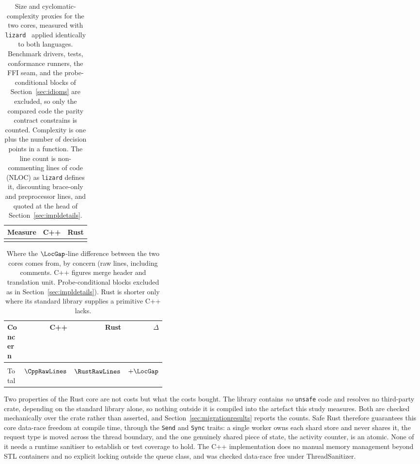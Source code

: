 \begin{table}[H]
\centering
\small
\caption[Size and cyclomatic-complexity proxies for the two cores]{Size and cyclomatic-complexity proxies for the two cores, measured with
\texttt{lizard}~\cite{lizard} applied identically to both languages. Benchmark drivers, tests,
conformance runners, the FFI seam, and the probe-conditional blocks of
Section~\ref{sec:idioms} are excluded, so only the compared code the parity contract constrains
is counted. Complexity is one plus the number of decision points in a function. The line count
is non-commenting lines of code (NLOC) as \texttt{lizard} defines it, discounting brace-only and
preprocessor lines, and quoted at the head of
Section~\ref{sec:impldetails}.\label{tab:complexity}}
\begin{tabular}{@{}l r r@{}}
\hline\hline
Measure & C++ & Rust \\
\hline
\\
\hline
\end{tabular}
\end{table}

\begin{table}[H]
\centering
\small
\caption[Where the line-count difference between the cores comes from]{Where the $\LocGap$-line difference between the two cores comes from, by concern (raw
lines, including comments. C++ figures merge header and translation unit. Probe-conditional
blocks excluded as in Section~\ref{sec:impldetails}). Rust is shorter
only where its standard library supplies a primitive C++ lacks.\label{tab:loc}}
\begin{tabular}{@{}R{0.38\linewidth} r r r@{}}
\hline\hline
Concern & C++ & Rust & $\Delta$ \\
\hline
\\
\hline
Total                             & $\CppRawLines$ & $\RustRawLines$ & $+\LocGap$ \\
\hline
\end{tabular}
\end{table}

Two properties of the Rust core are not costs but what the costs bought. The library contains
\emph{no} \texttt{unsafe} code and resolves no third-party crate, depending on the standard
library alone, so nothing outside it is compiled into the artefact this study measures. Both are
checked mechanically over the crate rather than asserted, and Section~\ref{sec:migrationresults}
reports the counts. Safe Rust therefore guarantees this core data-race freedom at compile time,
through the \texttt{Send} and \texttt{Sync} traits: a single worker owns each shard store and never
shares it, the request type is moved across the thread boundary, and the one genuinely shared
piece of state, the activity counter, is an atomic. None of it needs a runtime sanitiser to
establish or test coverage to hold. The C++ implementation does no manual memory management beyond
STL containers and no explicit locking outside the queue class, and was checked data-race free
under ThreadSanitizer.

